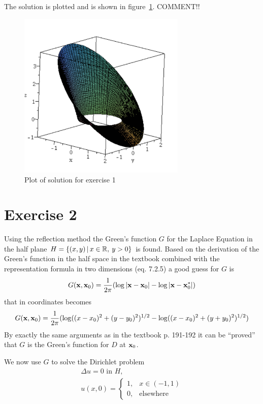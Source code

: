    The solution is plotted and is shown in figure~\ref{fig:q1-plot}. COMMENT!!
    \begin{figure}
        \centering
        \includegraphics[width=80mm]{q1-plot.pdf}
        \caption{Plot of solution for exercise 1}
        \label{fig:q1-plot}
    \end{figure}

    \section*{Exercise 2}
    Using the reflection method the Green's function $G$ for the Laplace Equation in the half plane $H=\{(x,y)\,|\,x\in\mathbb{R},\:y>0\}$ is found. Based on the derivation of the Green's function in the half space in the textbook combined with the representation formula in two dimensions (eq. 7.2.5) a good guess for $G$ is
    \begin{equation*}
        G(\mathbf{x}, \mathbf{x}_0) = \frac{1}{2\pi}(\log|\mathbf{x}-\mathbf{x}_0| - \log|\mathbf{x}-\mathbf{x}_0^*|)
    \end{equation*}
    that in coordinates becomes
    \begin{equation}\label{eq:green-coord}
        G(\mathbf{x}, \mathbf{x}_0) = \frac{1}{2\pi}(\log((x-x_0)^2 + (y-y_0)^2)^{1/2} - \log((x-x_0)^2 + (y+y_0)^2)^{1/2})
    \end{equation}
    By exactly the same arguments as in the textbook p. 191-192 it can be ``proved'' that $G$ is the Green's function for $D$ at $\mathbf{x}_0$. \par
    We now use $G$ to solve the Dirichlet problem
    \begin{gather*}
        \Delta u = 0 \text{ in } H, \\
        u(x, 0) = \begin{cases}
            1, & x\in(-1,1) \\
            0, & \text{elsewhere}
        \end{cases}
    \end{gather*}

